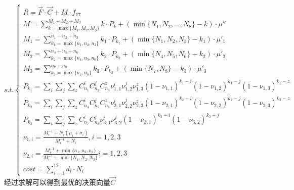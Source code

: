 \documentclass[withoutpreface,bwprint]{cumcmthesis} %
\begin{document}
\begin{equation*}
	s.t.\begin{cases}
		R=\vec{F}\cdot \vec{C} + M\cdot f_{17}                                                                                                 \\
		M=\sum_{k=\max \{M_{1},M_{2},M_{3}\}}^{M_{1}+M_{2}+M_{3}}k\cdot P_{k}+(\min \{N_{1},N_{2},\dots,N_{8}\}-k)\cdot \mu''                  \\
		M_{1}=\sum_{k_{1}=\max \{n_{1},n_{2},n_{3}\}}^{n_{1}+n_{2}+n_{3}}k_{1}\cdot P_{k_{1}}+(\min \{N_{1},N_{2},N_{3}\}-k_{1})\cdot \mu'_{1} \\
		M_{2}=\sum_{k_{2}=\max \{n_{4},n_{5},n_{6}\}}^{n_{4}+n_{5}+n_{6}}k_{2}\cdot P_{k_{2}}+(\min \{N_{4},N_{5},N_{6}\}-k_{2})\cdot \mu'_{2} \\
		M_{3}=\sum_{k_{3}=\max \{n_{7},n_{8}\}}^{n_{7}+n_{8}}k_{3}\cdot P_{k_{3}}+(\min \{N_{7},N_{8}\}-k_{3})\cdot \mu'_{3}                   \\
		P_{k_{1}}=\sum_{i}\sum_{j}\sum_{z}C_{n_{1}}^{i}C_{n_{2}}^{j}C_{n_{3}}^{z}\nu_{1,1}^{i}\nu_{1,2}^{j}\nu_{1,3}^{z}(1-\nu_{1,1})^{k_{1}-i}(1-\nu_{1,2})^{k_{1}-j}(1-\nu_{
		1,3})^{k_{1}-z}                                                                                                                        \\
		P_{k_{2}}=\sum_{i}\sum_{j}\sum_{z}C_{n_{4}}^{i}C_{n_{5}}^{j}C_{n_{6}}^{z}\nu_{2,1}^{i}\nu_{2,2}^{j}\nu_{2,3}^{z}(1-\nu_{2,1})^{k_{2}-i}(1-\nu_{2,2})^{k_{2}-j}(1-\nu_{
		2,3})^{k_{2}-z}                                                                                                                        \\
		P_{k_{3}}=\sum_{i}\sum_{j}\sum_{z}C_{n_{7}}^{i}C_{n_{8}}^{j}\nu_{3,1}^{i}\nu_{3,2}^{j}(1-\nu_{3,1})^{k_{3}-i}(1-\nu_{3,2})^{k_{3}-j}   \\
		\nu_{1,i}=\frac{M_{i}^{-1}+N_{i}(\mu_{i}+\sigma_{i})}{M_{i}^{-1}+N_{i}} ,i=1,2,3                                                       \\
		\nu_{2,i}=\frac{M_{i}^{-1}+\min \{ n_{1},n_{2},n_{3}\}}{M_{i}^{-1}+\min \{N_{1},N_{2},N_{3}\}} i=1,2,3                                 \\
		cost = \sum_{i=1}^{12}d_{i}\cdot N_{i}
	\end{cases}
\end{equation*}
经过求解可以得到最优的决策向量$\vec{C}$
\end{document}
